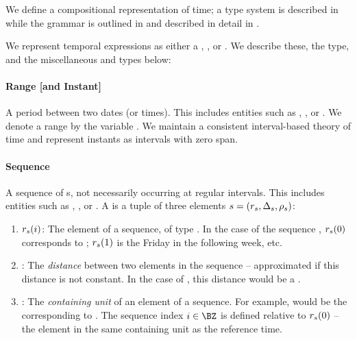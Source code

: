 We define a compositional representation of time; a type system 
	is described in  while the grammar is outlined in
	 and described in detail in 
	.

We represent temporal expressions as either a , ,
	or .
We describe these, the  type, and the miscellaneous
	 and  types below:
\paragraph{Range [and Instant]}
A period between two dates (or times).
This includes entities such as , , or
	.
We denote a range by the variable \range.
We maintain a consistent interval-based theory of time
	\cite{key:1981allen-temporal} and represent instants as intervals with
	zero span.

\paragraph{Sequence}
A sequence of s, not necessarily occurring at regular intervals.
This includes entities such as , , or
	.
A  is a tuple of three elements
	$s=(r_s,\Delta_s,\rho_s)$:
\begin{enumerate}
	\setlength{\itemsep}{-5pt} 
	\item $r_s(i)$: 
		The  element of a sequence, of type .
		In the case of the sequence , $r_s(0)$ corresponds to
			; 
			$r_s(1)$ is the Friday in the following week, etc.
	\item \seqjump:
		The \textit{distance} between two elements in the sequence -- approximated
			if this distance is not constant.
		In the case of , this distance would be a .
	\item \seqcanon:
		The \textit{containing unit} of an element of a sequence.
		For example,  would be the 
			corresponding to .
		The sequence index $i \in \BZ$ is defined relative to $r_s(0)$ --
			the element in the same containing unit as the reference time.
\end{enumerate}

